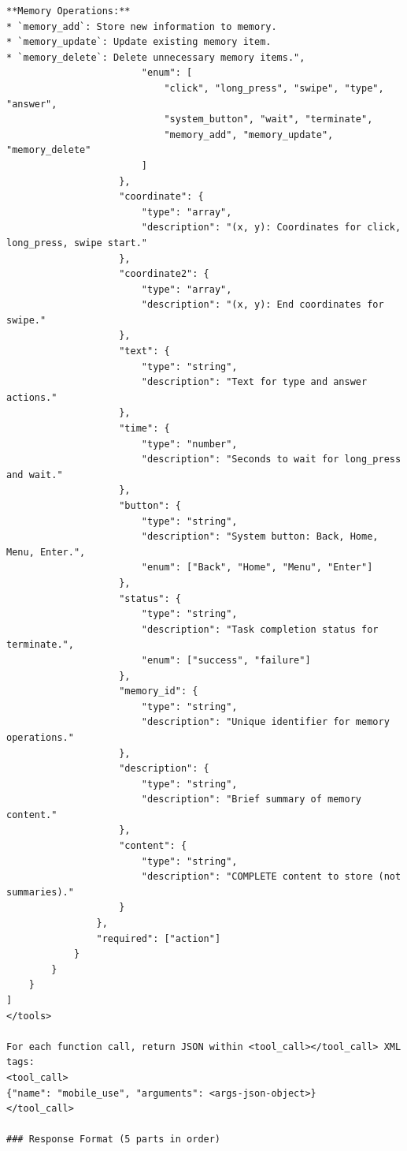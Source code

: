 \documentclass{llmxive}
\begin{document}
\begin{tcolorbox}[
  promptstyle,
  title=\texttt{Prompt for MemGUI-Agent (system prompt).},
]
\begin{Verbatim}[fontsize=\scriptsize,breaklines,breakanywhere]
**Memory Operations:**
* `memory_add`: Store new information to memory.
* `memory_update`: Update existing memory item.
* `memory_delete`: Delete unnecessary memory items.",
                        "enum": [
                            "click", "long_press", "swipe", "type", "answer",
                            "system_button", "wait", "terminate",
                            "memory_add", "memory_update", "memory_delete"
                        ]
                    },
                    "coordinate": {
                        "type": "array",
                        "description": "(x, y): Coordinates for click, long_press, swipe start."
                    },
                    "coordinate2": {
                        "type": "array",
                        "description": "(x, y): End coordinates for swipe."
                    },
                    "text": {
                        "type": "string",
                        "description": "Text for type and answer actions."
                    },
                    "time": {
                        "type": "number",
                        "description": "Seconds to wait for long_press and wait."
                    },
                    "button": {
                        "type": "string",
                        "description": "System button: Back, Home, Menu, Enter.",
                        "enum": ["Back", "Home", "Menu", "Enter"]
                    },
                    "status": {
                        "type": "string",
                        "description": "Task completion status for terminate.",
                        "enum": ["success", "failure"]
                    },
                    "memory_id": {
                        "type": "string",
                        "description": "Unique identifier for memory operations."
                    },
                    "description": {
                        "type": "string",
                        "description": "Brief summary of memory content."
                    },
                    "content": {
                        "type": "string",
                        "description": "COMPLETE content to store (not summaries)."
                    }
                },
                "required": ["action"]
            }
        }
    }
]
</tools>

For each function call, return JSON within <tool_call></tool_call> XML tags:
<tool_call>
{"name": "mobile_use", "arguments": <args-json-object>}
</tool_call>

### Response Format (5 parts in order)


\end{Verbatim}
\end{tcolorbox}
\end{document}

